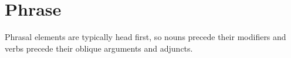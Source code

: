 
\section{Phrase}
Phrasal elements are typically head first, so nouns precede their modifiers and verbs precede their oblique arguments and adjuncts.